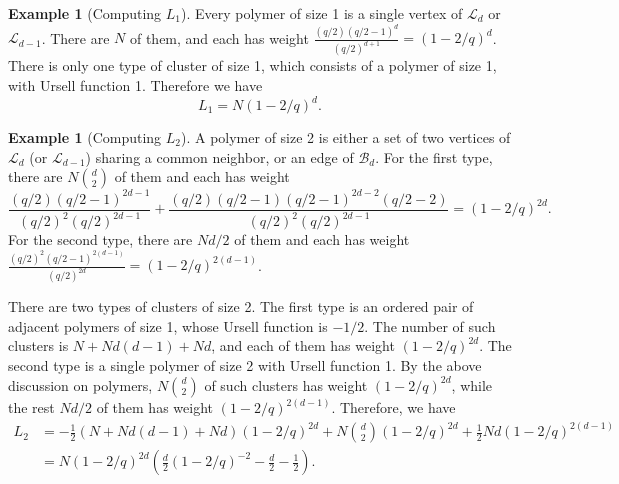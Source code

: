 \documentclass{amsart}
\theoremstyle{definition}
\newtheorem{example}[thm]{Example}
\newcommand{\cB}{\mathcal{B} }
\newcommand{\beq}[1]{\begin{equation}\label{#1}}
\newcommand{\enq}[0]{\end{equation}}
\newcommand{\0}[0]{\emptyset}
\begin{document}
\begin{example}[Computing $L_1$]
Every polymer of size 1 is a single vertex of $\mathcal{L}_d$ or $\mathcal{L}_{d-1}$. There are $N$ of them, and each has weight $\displaystyle \frac{(q/2)(q/2-1)^d}{(q/2)^{d+1}}=(1 - 2/q)^d$. There is only one type of cluster of size 1, which consists of a polymer of size 1, with Ursell function 1. Therefore we have 
\beq{L1.compute} L_1=N(1 - 2/q)^d.\enq
\end{example}

\begin{example}[Computing $L_2$]
A polymer of size 2 is either a set of two vertices of $\mathcal{L}_d$ (or $\mathcal{L}_{d-1}$) sharing a common neighbor, or an edge of $\cB_d$.
For the first type, there are $N\binom{d}{2}$ of them and each has weight 
\[\frac{(q/2)(q/2-1)^{2d-1}}{(q/2)^2(q/2)^{2d-1}} + \frac{(q/2)(q/2-1)(q/2-1)^{2d-2}(q/2-2)}{(q/2)^2(q/2)^{2d-1}}=(1 - 2/q)^{2d}. \]
For the second type, there are $Nd/2$ of them and each has weight $\displaystyle \frac{(q/2)^2(q/2-1)^{2(d-1)}}{(q/2)^{2d}}=(1 - 2/q)^{2(d-1)}$.

There are two types of clusters of size 2. The first type is an ordered pair of adjacent polymers of size 1, whose Ursell function is $-1/2$. The number of such clusters is $N+Nd(d-1) + Nd$, and each of them has weight $(1 - 2/q)^{2d}$.
The second type is a single polymer of size 2 with Ursell function 1. By the above discussion on polymers, $N\binom{d}{2}$ of such clusters has weight $(1 - 2/q)^{2d}$, while the rest $Nd/2$ of them has weight $(1 - 2/q)^{2(d-1)}$.
Therefore, we have
\beq{L2.compute}
\begin{split}
L_2&=-\frac12(N+Nd(d-1) + Nd)(1 - 2/q)^{2d} + N\binom{d}{2}(1 - 2/q)^{2d} + \frac{1}{2}Nd(1 - 2/q)^{2(d-1)}\\
&=N(1 - 2/q)^{2d}\left(\frac{d}{2}(1 - 2/q)^{-2} - \frac{d}{2}-\frac12\right).
\end{split}
\enq
\end{example}
\end{document}
